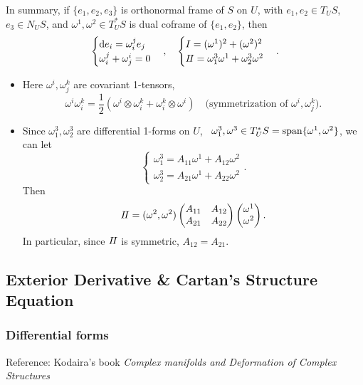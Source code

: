 In summary, if \(\{e_1,e_2,e_3\}\) is orthonormal frame of \(S\) on \(U\), with
\(e_1,e_2\in T_U S\), \(e_3\in N_U S\), and \(\omega^1,\omega^2\in T_U^*S\) is
dual coframe of \(\{e_1,e_2\}\), then \[
    \begin{cases}
        \dd{e_i}=\omega_i^je_j \\
        \omega_i^j+\omega_j^i=0
    \end{cases},\quad \begin{cases}
        I=(\omega^1)^2+(\omega^2)^2 \\
        I\!I=\omega_1^3\omega^1+\omega_2^3\omega^2
    \end{cases}
.\] 
\begin{remark}\hfill
\begin{itemize}
\item Here \(\omega^i,\omega_j^k\) are covariant 1-tensors, \[
    \omega^i\omega_i^k=\frac{1}{2}(\omega^i\otimes\omega_i^k+\omega_i^k\otimes\omega^i)
    \quad \text{(symmetrization of }\omega^i,\omega_j^k\text{)}
.\] 
\item Since \(\omega_1^3,\omega_2^3\) are differential 1-forms on \(U\), \ie\ \(
    \omega_1^3,\omega^3\in T_U^*S=\operatorname{span}\{\omega^1,\omega^2\}\), we can let \[
        \begin{cases}
            \omega_1^3=A_{11}\omega^1+A_{12}\omega^2 \\
            \omega_2^3=A_{21}\omega^1+A_{22}\omega^2
        \end{cases}
    .\] Then \[
        I\!I=(\omega^2,\omega^2)\begin{pmatrix}
            A_{11} & A_{12} \\
            A_{21} & A_{22}
        \end{pmatrix}\begin{pmatrix}
            \omega^1 \\ \omega^2
        \end{pmatrix}
    .\] In particular, since \(I\!I\) is symmetric, \(A_{12}=A_{21}\).
\end{itemize}
\end{remark}

\subsection{Exterior Derivative \& Cartan's Structure Equation}
\subsubsection{Differential forms}
Reference: Kodaira's book \emph{Complex manifolds and Deformation of Complex Structures}

